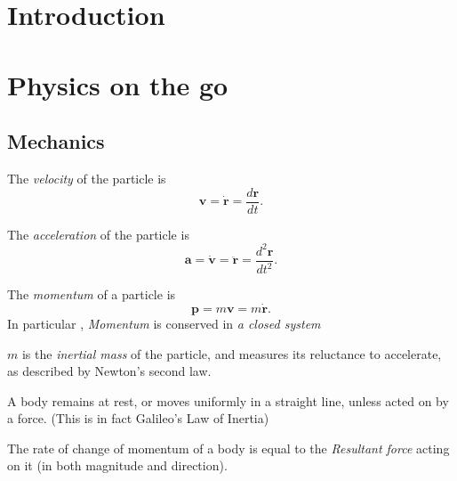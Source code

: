 \documentclass[a4paper]{article}
\begin{document}
\maketitle


\tableofcontents


\setcounter{section}{-1}
\section{Introduction}


\section{Physics on the go}
\subsection{Mechanics}

\begin{defi}[Velocity]
  The \emph{velocity} of the particle is
  \[
    \mathbf{v} = \dot{\mathbf{r}} = \frac{d \mathbf{r}}{d t}.
  \]
\end{defi}

\begin{defi}[Acceleration]
  The \emph{acceleration} of the particle is
  \[
    \mathbf{a} = \dot{\mathbf{v}} = \ddot{\mathbf{r}} = \frac{d^2 \mathbf{r}}{d t^2}.
  \]
\end{defi}

\begin{defi}[Momentum]
  The \emph{momentum} of a particle is
  \[
    \mathbf{p} = m\mathbf{v} = m\dot{\mathbf{r}}.
  \]
  In particular , \emph{Momentum} is conserved in \emph{a closed system}
  
  $m$ is the \emph{inertial mass} of the particle, and measures its reluctance to accelerate, as described by Newton's second law.
\end{defi}

\begin{law}
  A body remains at rest, or moves uniformly in a straight line, unless acted on by a force. (This is in fact Galileo's Law of Inertia)
\end{law}

\begin{law}
   The rate of change of momentum of a body is equal to the \emph{Resultant force} acting on it (in both magnitude and direction).
\end{law}
\end{document}
